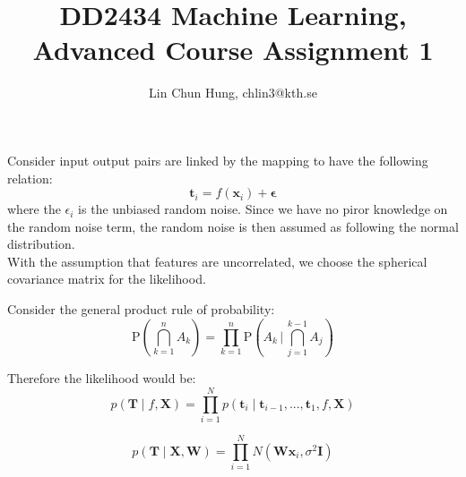 \documentclass[12pt]{article}
\newenvironment{question}[2][Question]{\begin{trivlist}
\kern10pt
\item[\hskip \labelsep {\bfseries #1}\hskip \labelsep {\bfseries #2.}]}{\end{trivlist}}
\begin{document}
 
 
 
\title{DD2434 Machine Learning, Advanced Course Assignment 1}
\author{Lin Chun Hung, chlin3@kth.se} 
 
\maketitle

\begin{question}{1}
Consider input output pairs are linked by the mapping to have the following
 relation:
\begin{equation}
    \textbf{t}_i = f(\textbf{x}_i) + \bm{\epsilon}
\end{equation}
where the $\epsilon_i$ is the unbiased random noise. Since we have no piror knowledge
on the random noise term, the random noise is then assumed as following the normal
distribution. \\

With the assumption that features are uncorrelated, we choose the spherical
covariance matrix for the likelihood.
\end{question} %

\begin{question}{2}
Consider the general product rule of probability:
$$\mathrm {P} \left(\bigcap _{k=1}^{n}A_{k}\right)=
  \prod _{k=1}^{n}\mathrm {P} \left(A_{k}\,{\Bigg |}\,\bigcap _{j=1}^{k-1}A_{j}\right)$$

Therefore the likelihood would be:
\begin{equation}
  p(\textbf{T}\mid f,\textbf{X}) =
  \prod _{i=1}^{N}p(\textbf{t}_i \mid \textbf{t}_{i-1},...,\textbf{t}_{1},
  f,\textbf{X})
\end{equation}

\end{question} %

\begin{question}{3}

\begin{equation}
  p(\textbf{T}\mid \textbf{X},\textbf{W}) =
  \prod _{i=1}^{N}N(\textbf{W}\textbf{x}_i, \sigma^2\textbf{I})
\end{equation}
\end{question} %

 
\end{document}
